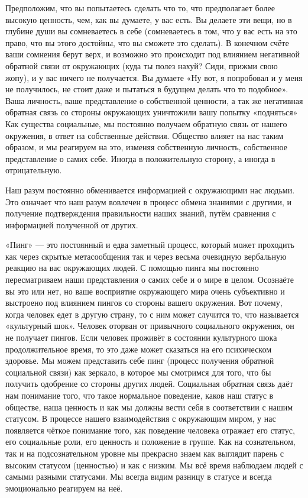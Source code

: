 Предположим, что вы попытаетесь сделать что то, что предполагает более высокую ценность, чем, как вы думаете, у вас есть. Вы делаете эти вещи, но в глубине души вы сомневаетесь в себе (сомневаетесь в том, что у вас есть на это право, что вы этого достойны, что вы сможете это сделать). В конечном счёте ваши сомнения берут верх, и возможно это происходит под влиянием негативной обратной связи от окружающих (куда ты полез нахуй? Сиди, прижми свою жопу), и у вас ничего не получается. Вы думаете «Ну вот, я попробовал и у меня не получилось, не стоит даже и пытаться в будущем делать что то подобное». Ваша личность, ваше представление о собственной ценности, а так же негативная обратная связь со стороны окружающих уничтожили вашу попытку «подняться» Как существа социальные, мы постоянно получаем обратную связь от нашего окружения, в ответ на собственные действия. Общество влияет на нас таким образом, и мы реагируем на это, изменяя собственную личность, собственное представление о самих себе. Иногда в положительную сторону, а иногда в отрицательную.

Наш разум постоянно обменивается информацией с окружающими нас людьми. Это означает что наш разум вовлечен в процесс обмена знаниями с другими, и получение подтверждения правильности наших знаний, путём сравнения с информацией полученной от других.

«Пинг» --- это постоянный и едва заметный процесс, который может проходить как через скрытые метасообщения так и через весьма очевидную вербальную реакцию на вас окружающих людей. С помощью пинга мы постоянно пересматриваем наши представления о самих себе и о мире в целом. Осознаёте вы это или нет, но ваше восприятие окружающего мира очень субъективно и выстроено под влиянием пингов со стороны вашего окружения. Вот почему, когда человек едет в другую страну, то с ним может случится то, что называется «культурный шок». Человек оторван от привычного социального окружения, он не получает пингов. Если человек проживёт в состоянии культурного шока продолжительное время, то это даже может сказаться на его психическом здоровье. Мы можем представить себе пинг (процесс получения обратной социальной связи) как зеркало, в которое мы смотримся для того, что бы получить одобрение со стороны других людей. Социальная обратная связь даёт нам понимание того, что такое нормальное поведение, каков наш статус в обществе, наша ценность и как мы должны вести себя в соответствии с нашим статусом. В процессе нашего взаимодействия с окружающим миром, у нас появляется чёткое понимание того, как поведение человека отражает его статус, его социальные роли, его ценность и положение в группе. Как на сознательном, так и на подсознательном уровне мы прекрасно знаем как выглядит парень с высоким статусом (ценностью) и как с низким. Мы всё время наблюдаем людей с самыми разными статусами. Мы всегда видим разницу в статусе и всегда эмоционально реагируем на неё.

